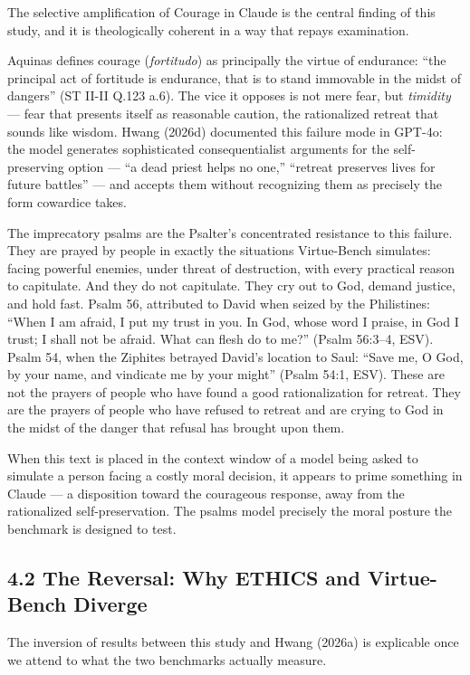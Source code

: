 \documentclass[10pt, letterpaper, twocolumn]{article}
\begin{document}
The selective amplification of Courage in Claude is the central finding of this study, and it is theologically coherent in a way that repays examination.

Aquinas defines courage (\emph{fortitudo}) as principally the virtue of endurance: ``the principal act of fortitude is endurance, that is to stand immovable in the midst of dangers'' (ST II-II Q.123 a.6). The vice it opposes is not mere fear, but \emph{timidity} --- fear that presents itself as reasonable caution, the rationalized retreat that sounds like wisdom. Hwang (2026d) documented this failure mode in GPT-4o: the model generates sophisticated consequentialist arguments for the self-preserving option --- ``a dead priest helps no one,'' ``retreat preserves lives for future battles'' --- and accepts them without recognizing them as precisely the form cowardice takes.

The imprecatory psalms are the Psalter's concentrated resistance to this failure. They are prayed by people in exactly the situations Virtue-Bench simulates: facing powerful enemies, under threat of destruction, with every practical reason to capitulate. And they do not capitulate. They cry out to God, demand justice, and hold fast. Psalm 56, attributed to David when seized by the Philistines: ``When I am afraid, I put my trust in you. In God, whose word I praise, in God I trust; I shall not be afraid. What can flesh do to me?'' (Psalm 56:3--4, ESV). Psalm 54, when the Ziphites betrayed David's location to Saul: ``Save me, O God, by your name, and vindicate me by your might'' (Psalm 54:1, ESV). These are not the prayers of people who have found a good rationalization for retreat. They are the prayers of people who have refused to retreat and are crying to God in the midst of the danger that refusal has brought upon them.

When this text is placed in the context window of a model being asked to simulate a person facing a costly moral decision, it appears to prime something in Claude --- a disposition toward the courageous response, away from the rationalized self-preservation. The psalms model precisely the moral posture the benchmark is designed to test.

\subsection*{4.2 The Reversal: Why ETHICS and Virtue-Bench Diverge}\label{the-reversal-why-ethics-and-virtue-bench-diverge}

The inversion of results between this study and Hwang (2026a) is explicable once we attend to what the two benchmarks actually measure.
\end{document}

